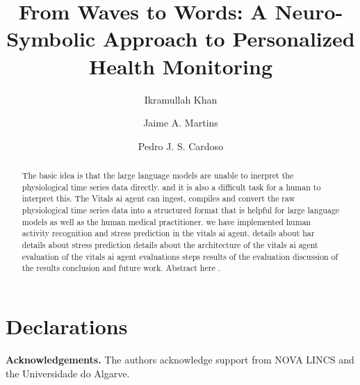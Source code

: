 \documentclass[number,nopreprintline]{elsarticle}
\def\corref#1{}%
\begin{document}
\begin{frontmatter}

  \title{From Waves to Words: A Neuro-Symbolic Approach to Personalized Health Monitoring}

  \author[nova,ise]{Ikramullah Khan\corref{cor1}}

  \author[ise,ceot]{Jaime A. Martins}

  \author[nova,ise]{Pedro J. S. Cardoso}

  \address[nova]{NOVA LINCS, Universidade do Algarve, 8005--139 Faro, Portugal}
  \address[ise]{ISE, Universidade do Algarve, 8005--139 Faro, Portugal}
  \address[ceot]{CEOT, Universidade do Algarve, 8005--139 Faro, Portugal}

  \begin{abstract}
    The basic idea is that the large language models are unable to inerpret the physiological time series data directly. and it is also a difficult task for a human to interpret this. The Vitals ai agent can ingest, compiles and convert the raw physiological time series data into a structured format that is helpful for large language models as well as the human medical practitioner.
    we have implemented human activity recognition and stress prediction in the vitals ai agent. 
    details about har
    details about stress prediction
    details about the architecture of the vitals ai agent
    evaluation of the vitals ai agent
    evaluations steps
    results of the evaluation
    discussion of the results
    conclusion and future work.
    Abstract here \cite{cite_needed}.
  \end{abstract}

  \begin{keyword}
    
  \end{keyword}

\end{frontmatter}










\section*{Declarations}
\noindent\textbf{Acknowledgements.} The authors acknowledge support from NOVA LINCS and the Universidade do Algarve.
\end{document}
